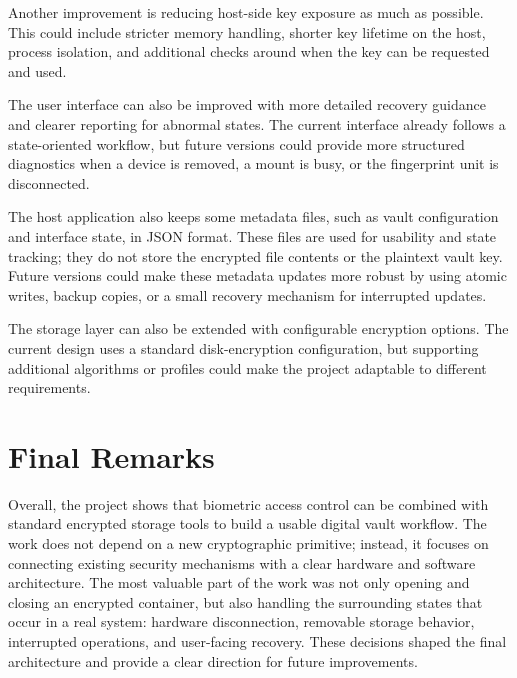 Another improvement is reducing host-side key exposure as much as possible. This could include stricter memory handling, shorter key lifetime on the host, process isolation, and additional checks around when the key can be requested and used.

The user interface can also be improved with more detailed recovery guidance and clearer reporting for abnormal states. The current interface already follows a state-oriented workflow, but future versions could provide more structured diagnostics when a device is removed, a mount is busy, or the fingerprint unit is disconnected.

The host application also keeps some metadata files, such as vault configuration and interface state, in JSON format. These files are used for usability and state tracking; they do not store the encrypted file contents or the plaintext vault key. Future versions could make these metadata updates more robust by using atomic writes, backup copies, or a small recovery mechanism for interrupted updates.

The storage layer can also be extended with configurable encryption options. The current design uses a standard disk-encryption configuration, but supporting additional algorithms or profiles could make the project adaptable to different requirements.

\section{Final Remarks}

Overall, the project shows that biometric access control can be combined with standard encrypted storage tools to build a usable digital vault workflow. The work does not depend on a new cryptographic primitive; instead, it focuses on connecting existing security mechanisms with a clear hardware and software architecture. The most valuable part of the work was not only opening and closing an encrypted container, but also handling the surrounding states that occur in a real system: hardware disconnection, removable storage behavior, interrupted operations, and user-facing recovery. These decisions shaped the final architecture and provide a clear direction for future improvements.
